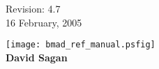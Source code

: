 \thispagestyle{empty}

\begin{flushright}
\large
  Revision: 4.7 \\
  16 February, 2005 \\
\end{flushright}

\vfill

{
\begin{center}
\texttt{[image: bmad\_ref\_manual.psfig]} \\
\vskip 0.3in
\huge\bf David Sagan
\end{center}
}

\vfill
\break